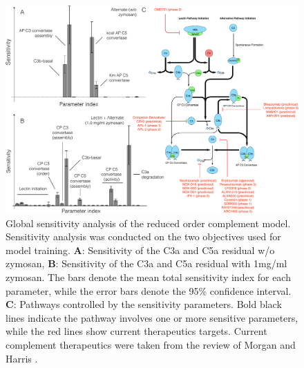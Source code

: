 \documentclass[12pt]{article}
\begin{document}
\begin{figure}[h]
\centering
\includegraphics[width=1.1\textwidth]{./figs/Figure4_Sensitivity_v3.pdf}
\caption{Global sensitivity analysis of the reduced order complement model.
Sensitivity analysis was conducted on the two objectives used for model training.
\textbf{A}: Sensitivity of the C3a and C5a residual w/o zymosan,
\textbf{B}: Sensitivity of the C3a and C5a residual with 1mg/ml zymosan.
The bars denote the mean total sensitivity index for each parameter, while the error bars denote the 95\% confidence interval.
\textbf{C}: Pathways controlled by the sensitivity parameters.
Bold black lines indicate the pathway involves one or more sensitive parameters, while the red lines show current therapeutics targets.
Current complement therapeutics were taken from the review of Morgan and Harris \cite{morgan2015complement}. }\label{fig-SA}
\end{figure}
\end{document}
